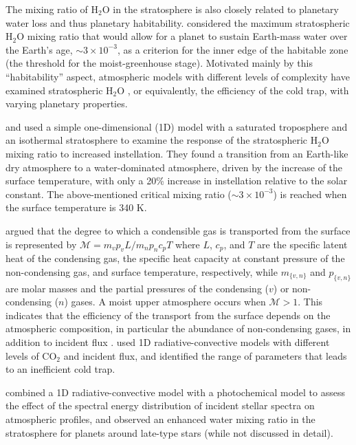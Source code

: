 \documentclass[11pt,numberedappendix,twocolappendix,]{emulateapj}
\def\water{H$_2$O }
\newcommand{\dsa}[1]{{\color{blue}#1}}
\begin{document}
The mixing ratio of \water in the stratosphere is also closely related to planetary water loss and thus planetary habitability. 
\citet{Kasting1993} considered the maximum stratospheric \water mixing ratio that would allow for a planet to sustain Earth-mass water over the Earth's age, $\sim 3 \times 10^{-3}$, as a criterion for the inner edge of the habitable zone (the threshold for the moist-greenhouse stage). 
Motivated mainly by this ``habitability'' aspect, atmospheric models with different levels of complexity have \dsa{examined stratospheric} \water, or equivalently, the efficiency of the cold trap, with varying planetary properties. 

\citet{Kasting1993} and \citet{Kopparapu2013} used a simple \dsa{one-dimensional (1D)} model with \dsa{a} saturated troposphere and \dsa{an} isothermal stratosphere to examine the response of the stratospheric \water mixing ratio to increased instellation. 
They found a transition from an Earth-like dry atmosphere to \dsa{a} water-dominated atmosphere, driven by the increase of the surface temperature, \dsa{with only a 20\% increase in instellation relative to the solar constant}. 
The above-mentioned critical mixing ratio ($\sim 3 \times 10^{-3}$) is reached when the surface temperature is 340 K. 


\citet{Wordsworth2013,Wordsworth2014} argued that the degree \dsa{to which a condensible gas is transported} from the surface is represented by $\mathcal{M} = m_v p_v L / m_n p_n c_p T $ where $L$, $c_p$, and $T$ are the specific latent heat of the condensing gas, the specific heat capacity at constant pressure of the non-condensing gas, and surface  temperature, respectively, while $m_{\{v,n\}}$ and $p_{\{v,n\}}$ are molar masses and the partial pressures of \dsa{the} condensing ($v$) or non-condensing ($n$) gases. 
\dsa{A} moist upper atmosphere occurs when $\mathcal{M} > 1$. 
This indicates that the \dsa{efficiency of the transport} from the surface depends on the atmospheric composition, in particular the abundance of non-condensing gases, in addition to incident flux \citep{Wordsworth2014}. 
\citet{Wordsworth2013} used 1D radiative-convective models with different levels of CO$_2$ and incident flux, and identified the range of parameters that leads to an inefficient cold trap. 

\citet{Rugheimer2013,Rugheimer2015} combined a 1D radiative-convective model with a photochemical model to assess the effect of the spectral energy distribution of incident stellar spectra on atmospheric profiles, and observed an enhanced water mixing ratio in the stratosphere for planets around late-type stars (while not discussed in detail). 
\end{document}
